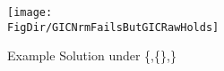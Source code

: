 \hypertarget{GICNrmFailsButGICRawHolds}{}
\begin{figure}[tbp]
\centerline{\texttt{[image: \\FigDir/GICNrmFailsButGICRawHolds]}}
\caption{Example Solution under \{\FVAC,\{\GICRaw\},\cncl{\GICNrm}\}}
\label{fig:GICNrmFailsButGICRawHolds}
\end{figure}
